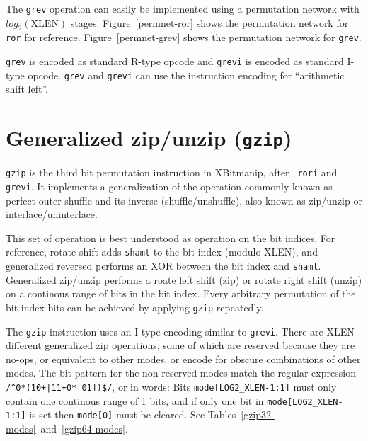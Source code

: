 The {\tt grev} operation can easily be implemented using a permutation
network with $log_2(\textrm{XLEN})$ stages. Figure~\ref{permnet-ror}
shows the permutation network for {\tt ror} for reference.
Figure~\ref{permnet-grev} shows the permutation network for {\tt grev}.



\texttt{grev} is encoded as standard R-type opcode and \texttt{grevi} is
encoded as standard I-type opcode. \texttt{grev} and \texttt{grevi} can
use the instruction encoding for ``arithmetic shift left''.

%
%
%


\section{Generalized zip/unzip (\texttt{gzip})}
\label{gzip}

{\tt gzip} is the third bit permutation instruction in XBitmanip, after {\tt
rori} and {\tt grevi}. It implements a generalization of the operation commonly
known as perfect outer shuffle and its inverse (shuffle/unshuffle), also known
as zip/unzip or interlace/uninterlace.

This set of operation is best understood as operation on the bit indices. For
reference, rotate shift adds {\tt shamt} to the bit index (modulo XLEN), and
generalized reversed performs an XOR between the bit index and {\tt shamt}.
Generalized zip/unzip performs a roate left shift (zip) or rotate right shift (unzip)
on a continous range of bits in the bit index. Every arbitrary permutation
of the bit index bits can be achieved by applying {\tt gzip} repeatedly.

The {\tt gzip} instruction uses an I-type encoding similar to {\tt grevi}.
There are XLEN different generalized zip operations, some of which are reserved
because they are no-ops, or equivalent to other modes, or encode for obscure
combinations of other modes. The bit pattern for the non-reserved modes
match the regular expression {\tt /\^{}0*(10+|11+0*[01])\$/}, or in words:
Bits {\tt mode[LOG2\_XLEN-1:1]} must only contain one continous range of
1 bits, and if only one bit in {\tt mode[LOG2\_XLEN-1:1]} is set then
{\tt mode[0]} must be cleared. See Tables~\ref{gzip32-modes}~and~\ref{gzip64-modes}.

